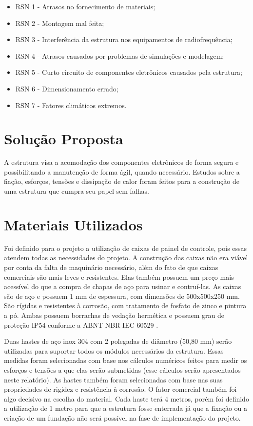 \begin{itemize}
\item RSN 1 - Atrasos no fornecimento de materiais;
\item RSN 2 - Montagem mal feita;
\item RSN 3 - Interferência da estrutura nos equipamentos de radiofrequência;
\item RSN 4 - Atrasos causados por problemas de simulações e modelagem;
\item RSN 5 - Curto circuito de componentes eletrônicos causados pela estrutura;
\item RSN 6 - Dimensionamento errado;
\item RSN 7 - Fatores climáticos extremos.
\end{itemize}

\section{Solução Proposta}

A estrutura visa a acomodação dos componentes eletrônicos de forma segura e possibilitando a manutenção de forma ágil, quando necessário. Estudos sobre a fiação, esforços, tensões e dissipação de calor foram feitos para a construção de uma estrutura que cumpra seu papel sem falhas.

\section{Materiais Utilizados}

Foi definido para o projeto a utilização de caixas de painel de controle, pois essas atendem todas as necessidades do projeto. A construção das caixas não era viável por conta da falta de maquinário necessário, além do fato de que caixas comerciais são mais leves e resistentes. Elas também possuem um preço mais acessível do que a compra de chapas de aço para usinar e contruí-las. As caixas são de aço e possuem 1 mm de espessura, com dimensões de 500x500x250 mm. São rígidas e resistentes à corrosão, com tratamento de fosfato de zinco e pintura a pó. Ambas possuem borrachas de vedação hermética e possuem grau de proteção IP54 conforme a ABNT NBR IEC 60529 \cite{material}. 

Duas hastes de aço inox 304 com 2 polegadas de diâmetro (50,80 mm) serão utilizadas para suportar todos os módulos necessários da estrutura. Essas medidas foram selecionadas com base nos cálculos numéricos feitos para medir os esforços e tensões a que elas serão submetidas (esse cálculos serão apresentados neste relatório). As hastes também foram selecionadas com base nas suas propriedades de rigidez e resistência à corrosão. O fator comercial também foi algo decisivo na escolha do material. Cada haste terá 4 metros, porém foi definido a utilização de 1 metro para que a estrutura fosse enterrada já que a fixação ou a criação de um fundação não será possível na fase de implementação do projeto. 

